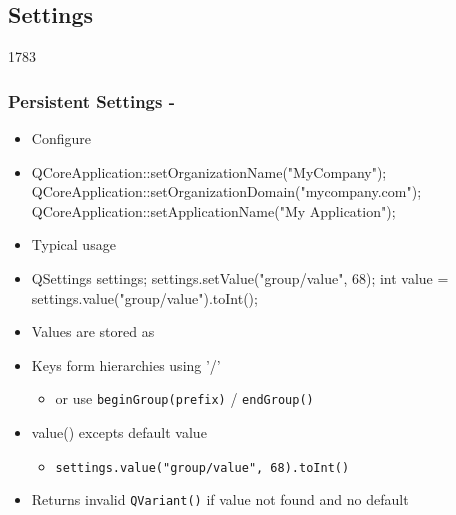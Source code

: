 %
%
%
%

\subsection{Settings}

\begin{slide}[fragile]{1783}\frametitle{Persistent Settings - }
  \begin{itemize}
 \item Configure 
  \item[] \begin{cpp}
QCoreApplication::setOrganizationName("MyCompany");
QCoreApplication::setOrganizationDomain("mycompany.com");
QCoreApplication::setApplicationName("My Application");
  \end{cpp}
 \item Typical usage
  \item[] \begin{cpp}
QSettings settings; 
settings.setValue("group/value", 68);    
int value = settings.value("group/value").toInt();
  \end{cpp}
  \item Values are stored as 
  \item Keys form hierarchies using '/'
   \begin{itemize}
   \item or use \texttt{beginGroup(prefix)} / \texttt{endGroup()} 
   \end{itemize}
 \item value() excepts default value
   \begin{itemize}
   \item \lstinline{settings.value("group/value", 68).toInt()}
 \end{itemize}
   \item Returns invalid \texttt{QVariant()} if value not found and no default

   \end{itemize}
\end{slide}

